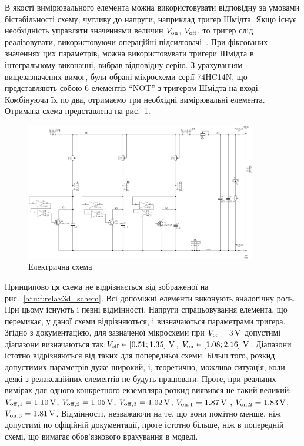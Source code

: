 В якості вимірювального елемента можна використовувати
відповідну за умовами бістабільності схему, чутливу до напруги,
наприклад тригер Шмідта. Якщо існує необхідність управляти
значеннями величин
$ V _\mathrm{on} $,
$ V _\mathrm{off} $, то тригер слід реалізовувати, використовуючи
операційні підсилювачі~\cite{horowitz}. При фіксованих значеннях
цих параметрів, можна використовувати тригери Шмідта в
інтегральному виконанні, вибрав відповідну серію. З
урахуванням вищезазначених вимог, були обрані мікросхеми
серії 74HC14N, що представляють собою 6 елементів ``NOT'' з тригером
Шмідта на вході. Комбінуючи їх по два, отримаємо три необхідні
вимірювальні елемента. Отримана схема представлена на
рис.~\ref{atu:f:relax3ds_schem}.


\begin{figure}[htb!]
  \centerline{\includegraphics[width=0.9\textwidth]{p/relax3ds_schem.png} }
\caption{Електрична схема \RelaxShIi}
\label{atu:f:relax3ds_schem}
\end{figure}

Принципово ця схема не відрізняється від зображеної
на рис.~\ref{atu:f:relax3d_schem}. Всі допоміжні елементи виконують
аналогічну роль. При цьому існують і певні відмінності. Напруги
спрацьовування  елемента, що перемикає, у даної схеми
відрізняються, і визначаються параметрами тригера. Згідно з
документацією, для зазначеної мікросхеми при
$ V _\mathrm{cc} = \SI{3}{\volt} $ допустимі діапазони визначаються так:$ V _\mathrm{off}
\in [0.51; 1.35]~\SI{}{\volt} $,
$ V _\mathrm{on} \in [1.08; 2.16]~\SI{}{\volt} $. Діапазони істотно відрізняються
від таких для попередньої схеми. Більш того, розкид допустимих
параметрів дуже широкий, і, теоретично, можливо ситуація, коли
деякі з релаксаційних елементів не будуть працювати. Проте,
при реальних вимірах для одного конкретного екземпляра розкид
виявився не такий великий:
$ V _\mathrm{off, 1} = \SI{1.10}{\volt} $,
$ V _\mathrm{off, 2} = \SI{1.05}{\volt} $,
$ V _\mathrm{off, 3} = \SI{1.02}{\volt} $,
$ V _\mathrm{on, 1} = \SI{1.87}{\volt} $ ,
$ V _\mathrm{on, 2} = \SI{1.83}{\volt} $,
$ V _\mathrm{on, 3} = \SI{1.81}{\volt} $. Відмінності, незважаючи на те, що вони
помітно менше, ніж допустимі по офіційній документації, проте
істотно більше, ніж в попередній схемі, що вимагає обов'язкового
врахування в моделі.

